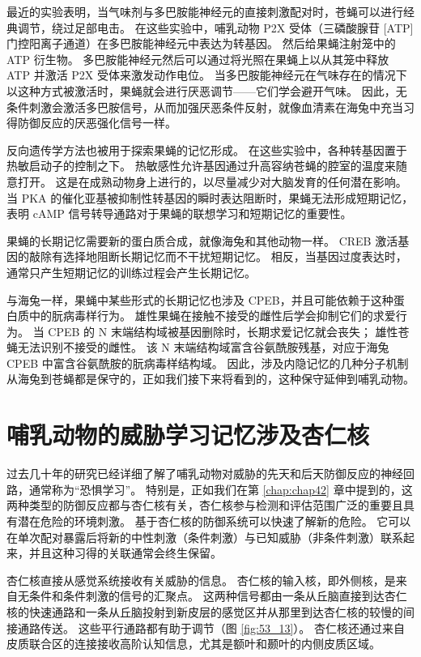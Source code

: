最近的实验表明，当气味剂与多巴胺能神经元的直接刺激配对时，苍蝇可以进行经典调节，绕过足部电击。 在这些实验中，哺乳动物 P2X 受体（三磷酸腺苷 [ATP] 门控阳离子通道）在多巴胺能神经元中表达为转基因。 然后给果蝇注射笼中的 ATP 衍生物。 多巴胺能神经元然后可以通过将光照在果蝇上以从其笼中释放 ATP 并激活 P2X 受体来激发动作电位。 当多巴胺能神经元在气味存在的情况下以这种方式被激活时，果蝇就会进行厌恶调节——它们学会避开气味。 因此，无条件刺激会激活多巴胺信号，从而加强厌恶条件反射，就像血清素在海兔中充当习得防御反应的厌恶强化信号一样。

反向遗传学方法也被用于探索果蝇的记忆形成。 在这些实验中，各种转基因置于热敏启动子的控制之下。 热敏感性允许基因通过升高容纳苍蝇的腔室的温度来随意打开。 这是在成熟动物身上进行的，以尽量减少对大脑发育的任何潜在影响。 当 PKA 的催化亚基被抑制性转基因的瞬时表达阻断时，果蝇无法形成短期记忆，表明 cAMP 信号转导通路对于果蝇的联想学习和短期记忆的重要性。

果蝇的长期记忆需要新的蛋白质合成，就像海兔和其他动物一样。 CREB 激活基因的敲除有选择地阻断长期记忆而不干扰短期记忆。 相反，当基因过度表达时，通常只产生短期记忆的训练过程会产生长期记忆。

与海兔一样，果蝇中某些形式的长期记忆也涉及 CPEB，并且可能依赖于这种蛋白质中的朊病毒样行为。 雄性果蝇在接触不接受的雌性后学会抑制它们的求爱行为。 当 CPEB 的 N 末端结构域被基因删除时，长期求爱记忆就会丧失； 雄性苍蝇无法识别不接受的雌性。 该 N 末端结构域富含谷氨酰胺残基，对应于海兔 CPEB 中富含谷氨酰胺的朊病毒样结构域。 因此，涉及内隐记忆的几种分子机制从海兔到苍蝇都是保守的，正如我们接下来将看到的，这种保守延伸到哺乳动物。


\section{哺乳动物的威胁学习记忆涉及杏仁核}
过去几十年的研究已经详细了解了哺乳动物对威胁的先天和后天防御反应的神经回路，通常称为“恐惧学习”。 特别是，正如我们在第 \ref{chap:chap42} 章中提到的，这两种类型的防御反应都与杏仁核有关，杏仁核参与检测和评估范围广泛的重要且具有潜在危险的环境刺激。 基于杏仁核的防御系统可以快速了解新的危险。 它可以在单次配对暴露后将新的中性刺激（条件刺激）与已知威胁（非条件刺激）联系起来，并且这种习得的关联通常会终生保留。

杏仁核直接从感觉系统接收有关威胁的信息。 杏仁核的输入核，即外侧核，是来自无条件和条件刺激的信号的汇聚点。 这两种信号都由一条从丘脑直接到达杏仁核的快速通路和一条从丘脑投射到新皮层的感觉区并从那里到达杏仁核的较慢的间接通路传送。 这些平行通路都有助于调节（图 \ref{fig:53_13}）。 杏仁核还通过来自皮质联合区的连接接收高阶认知信息，尤其是额叶和颞叶的内侧皮质区域。

